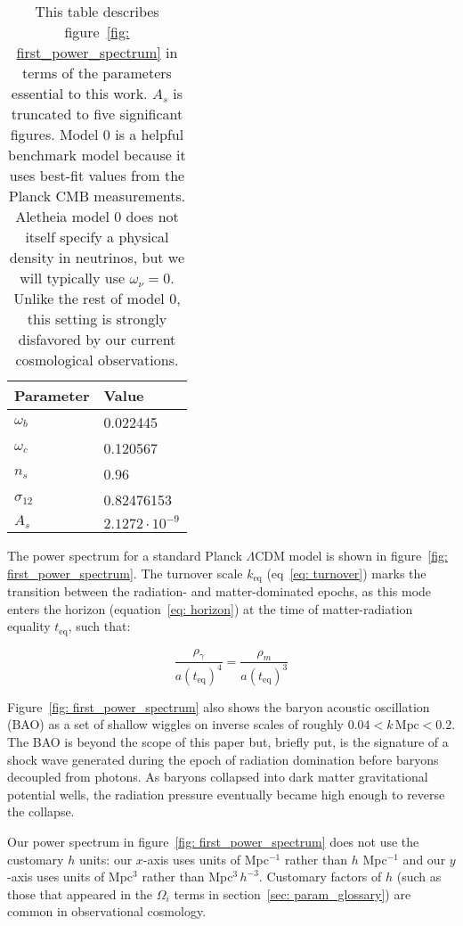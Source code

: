 \begin{table}[ht!]
\centering
\begin{tabular}{l|l}
\hline
Parameter & Value \\ \hline
$\omega_b$ & 0.022445 \\
$\omega_c$ & 0.120567 \\
$n_s$ & 0.96 \\
$\sigma_{12}$ & 0.82476153 \\
$A_s$ & $2.1272 \cdot 10^{-9}$ \\ \hline
\end{tabular}
 \caption[Aletheia Model 0 Parameters]{This table describes
 figure~\ref{fig: first_power_spectrum} in terms of the parameters
 essential to this work. $A_s$ is truncated to five significant figures.
 Model 0 is a helpful benchmark model because it uses
 best-fit values from the Planck CMB measurements. Aletheia model 0 does not
 itself specify a physical density in neutrinos, but we will typically use
 $\omega_\nu = 0$. Unlike the rest of model 0, this setting is strongly 
 	disfavored by our current cosmological observations.}
 \label{tab: Aletheia_m0}
\end{table}

The power spectrum for a standard Planck $\Lambda$CDM model is shown in
figure~\ref{fig: first_power_spectrum}. The turnover scale $k_\text{eq}$
(eq~\ref{eq: turnover}) marks
the transition between the radiation- and matter-dominated epochs, as
this mode enters the horizon (equation~\ref{eq: horizon}) at the time of
matter-radiation equality $t_\text{eq}$, such that:

\begin{equation}
\frac{\rho_\gamma}{a(t_\text{eq})^4}
=
\frac{\rho_m}{a(t_\text{eq})^3}
\end{equation} 

Figure~\ref{fig: first_power_spectrum} also shows the baryon acoustic
oscillation (BAO) as a set of shallow wiggles on inverse scales of roughly
$0.04 < k \, \text{Mpc} < 0.2$. The BAO is beyond the scope of this paper but,
briefly put, is the signature of a shock wave generated during the epoch of
radiation domination before baryons decoupled from photons. As baryons
collapsed into dark matter gravitational potential wells, the radiation
pressure eventually became high enough to reverse the collapse.


Our power spectrum in
figure~\ref{fig: first_power_spectrum} does not use the customary $h$ units:
our $x$-axis uses units of Mpc$^{-1}$ rather than $h$ Mpc$^{-1}$ and our
$y$-axis uses units of Mpc$^3$ rather than Mpc$^3 \, h^{-3}$. 
Customary factors of $h$ (such as those that appeared in the $\Omega_i$
terms in section~\ref{sec: param_glossary}) are common in observational
cosmology.

